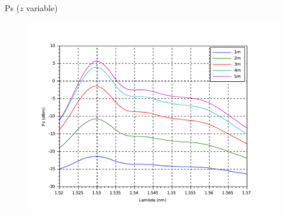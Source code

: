 \documentclass{beamer}
\begin{document}
\begin{frame}{Ps ($z$ variable)}

\begin{figure}
    \centering
    \includegraphics[width=\textwidth]{Ps.pdf}
\end{figure}

\end{frame}
\end{document}
